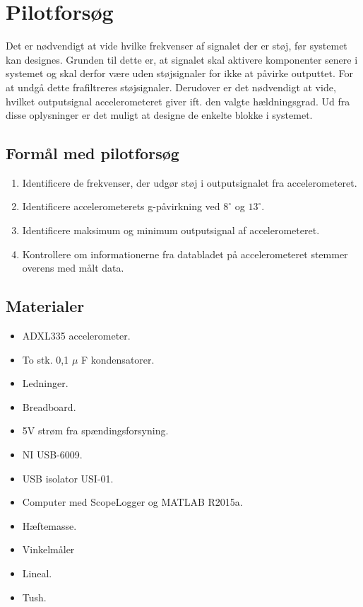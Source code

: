 \section{Pilotforsøg}
Det er nødvendigt at vide hvilke frekvenser af signalet der er støj, før systemet kan designes. Grunden til dette er, at signalet skal aktivere komponenter senere i systemet og skal derfor være uden støjsignaler for ikke at påvirke outputtet. For at undgå dette frafiltreres støjsignaler. Derudover er det nødvendigt at vide, hvilket outputsignal accelerometeret giver ift. den valgte hældningsgrad. Ud fra disse oplysninger er det muligt at designe de enkelte blokke i systemet.%

\subsection{Formål med pilotforsøg}
\begin{enumerate}
\item Identificere de frekvenser, der udgør støj i outputsignalet fra accelerometeret.
\item Identificere accelerometerets g-påvirkning ved $8^{\circ}$ og $13^{\circ}$.
\item Identificere maksimum og minimum outputsignal af accelerometeret.
\item Kontrollere om informationerne fra databladet på accelerometeret stemmer overens med målt data.
\end{enumerate}

\subsection{Materialer}
\begin{itemize}
\item ADXL335 accelerometer.
\item To stk. 0,1 $\mu$ F kondensatorer.
\item Ledninger.
\item Breadboard.
\item 5V strøm fra spændingsforsyning.
\item NI USB-6009.
\item USB isolator USI-01.
\item Computer med ScopeLogger og MATLAB R2015a.
\item Hæftemasse.
\item Vinkelmåler
\item Lineal.
\item Tush.
\end{itemize}

